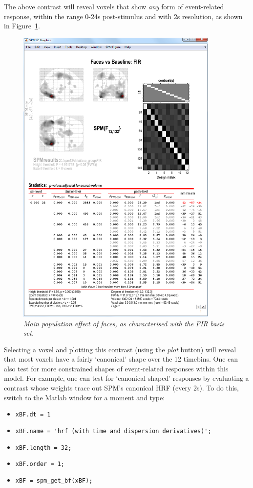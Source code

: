 \documentclass[a4paper,titlepage]{book}
\newcommand{\bi}{\begin{itemize}}
\newcommand{\ei}{\end{itemize}}
\begin{document}
The above contrast will reveal voxels that show {\em any} form of event-related response, within the range 0-24s post-stimulus and with 2s resolution, as shown in Figure~\ref{fir_results}. 
\begin{figure}
\begin{center}
\includegraphics[width=100mm]{faces_group/fir_results}
\caption{\em Main population effect of faces, as characterised with the FIR basis set. \label{fir_results}}
\end{center}
\end{figure}
Selecting a voxel and plotting this contrast (using the {\em plot} button) will reveal that most voxels have a fairly `canonical' shape over the 12 timebins.
One can also test for more constrained shapes of event-related responses within this model. For example, one can test for `canonical-shaped' responses by evaluating a contrast whose weights trace out SPM's canonical HRF (every 2s). To do this, switch to the Matlab window for a moment and type:
\bi
\item{\verb!xBF.dt = 1!}
\item{\verb!xBF.name = 'hrf (with time and dispersion derivatives)';!}
\item{\verb!xBF.length = 32;!}
\item{\verb!xBF.order = 1;!}
\item{\verb!xBF = spm_get_bf(xBF);!}
\ei
\end{document}
